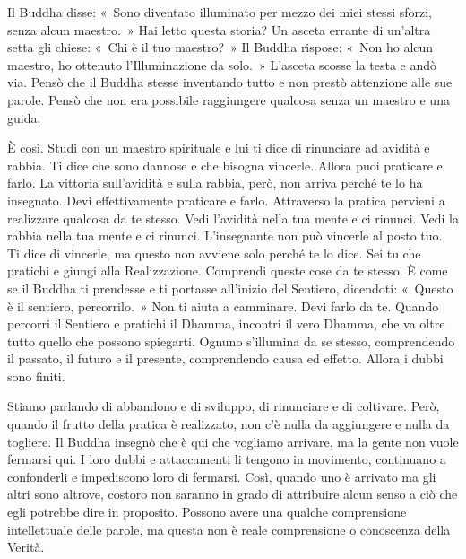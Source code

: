 Il Buddha disse: «~Sono diventato illuminato per mezzo dei miei stessi
sforzi, senza alcun maestro.~» Hai letto questa storia? Un asceta
errante di un'altra setta gli chiese: «~Chi è il tuo maestro?~» Il
Buddha rispose: «~Non ho alcun maestro, ho ottenuto l'Illuminazione da
solo.~» L'asceta scosse la testa e andò via. Pensò che il Buddha stesse
inventando tutto e non prestò attenzione alle sue parole. Pensò che non
era possibile raggiungere qualcosa senza un maestro e una guida.

È così. Studi con un maestro spirituale e lui ti dice di rinunciare ad
avidità e rabbia. Ti dice che sono dannose e che bisogna vincerle.
Allora puoi praticare e farlo. La vittoria sull'avidità e sulla rabbia,
però, non arriva perché te lo ha insegnato. Devi effettivamente
praticare e farlo. Attraverso la pratica pervieni a realizzare qualcosa
da te stesso. Vedi l'avidità nella tua mente e ci rinunci. Vedi la
rabbia nella tua mente e ci rinunci. L'insegnante non può vincerle al
posto tuo. Ti dice di vincerle, ma questo non avviene solo perché te lo
dice. Sei tu che pratichi e giungi alla Realizzazione. Comprendi queste
cose da te stesso. È come se il Buddha ti prendesse e ti portasse
all'inizio del Sentiero, dicendoti: «~Questo è il sentiero,
percorrilo.~» Non ti aiuta a camminare. Devi farlo da te. Quando
percorri il Sentiero e pratichi il Dhamma, incontri il vero Dhamma, che
va oltre tutto quello che possono spiegarti. Ognuno s'illumina da se
stesso, comprendendo il passato, il futuro e il presente, comprendendo
causa ed effetto. Allora i dubbi sono finiti.

Stiamo parlando di abbandono e di sviluppo, di rinunciare e di
coltivare. Però, quando il frutto della pratica è realizzato, non c'è
nulla da aggiungere e nulla da togliere. Il Buddha insegnò che è qui che
vogliamo arrivare, ma la gente non vuole fermarsi qui. I loro dubbi e
attaccamenti li tengono in movimento, continuano a confonderli e
impediscono loro di fermarsi. Così, quando uno è arrivato ma gli altri
sono altrove, costoro non saranno in grado di attribuire alcun senso a
ciò che egli potrebbe dire in proposito. Possono avere una qualche
comprensione intellettuale delle parole, ma questa non è reale
comprensione o conoscenza della Verità.

